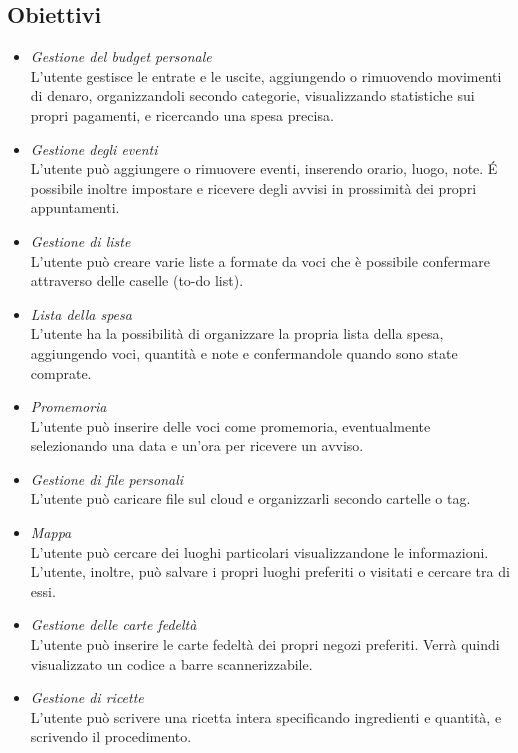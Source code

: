 \documentclass[a4paper,12pt]{article}
\begin{document}
\subsection*{Obiettivi}
\begin{itemize}
 \setlength\itemsep{0.01em}
\item \textit{ Gestione del budget personale}
\\ L'utente gestisce le entrate e le uscite, aggiungendo o rimuovendo movimenti di denaro, organizzandoli secondo categorie, visualizzando statistiche sui propri pagamenti, e ricercando una spesa precisa.
\item \textit{ Gestione degli eventi }
\\ L'utente può aggiungere o rimuovere eventi, inserendo orario, luogo, note. É possibile inoltre impostare e ricevere degli avvisi in prossimità dei propri appuntamenti.
\item \textit{ Gestione di liste }
\\ L'utente può creare varie liste a formate da voci che è possibile confermare attraverso delle caselle (to-do list).
\item \textit{ Lista della spesa}
\\ L'utente ha la possibilità di organizzare la propria lista della spesa, aggiungendo voci, quantità e note e confermandole quando sono state comprate. 
\item \textit{ Promemoria}
\\ L'utente può inserire delle voci come promemoria, eventualmente selezionando una data e un'ora per ricevere un avviso.
\item \textit{ Gestione di file personali }
\\ L'utente può caricare file sul cloud e organizzarli secondo cartelle o tag.
\item \textit{ Mappa }
\\ L'utente può cercare dei luoghi particolari visualizzandone le informazioni. L'utente, inoltre, può salvare i propri luoghi preferiti o visitati e cercare tra di essi.
\item \textit{ Gestione delle carte fedeltà}
\\ L'utente può inserire le carte fedeltà dei propri negozi preferiti. Verrà quindi visualizzato un codice a barre scannerizzabile.
\item \textit{ Gestione di ricette}
\\ L'utente può scrivere una ricetta intera specificando ingredienti e quantità, e scrivendo il procedimento.
\end{itemize}
\end{document}
